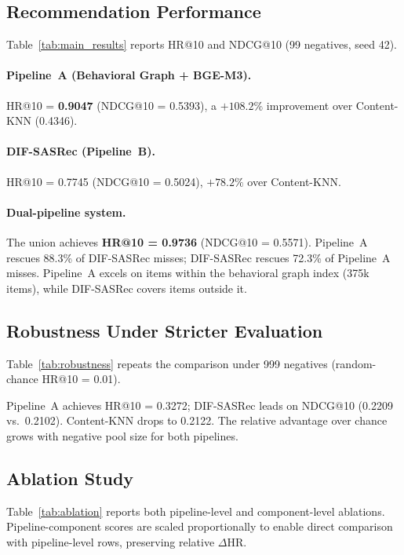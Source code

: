 \subsection{Recommendation Performance}
Table~\ref{tab:main_results} reports HR@10 and NDCG@10 (99 negatives, seed 42).

\paragraph{Pipeline~A (Behavioral Graph + BGE-M3).}
HR@10 = \textbf{0.9047} (NDCG@10 = 0.5393), a $+108.2\%$ improvement over
Content-KNN (0.4346).

\paragraph{DIF-SASRec (Pipeline~B).}
HR@10 = 0.7745 (NDCG@10 = 0.5024), $+78.2\%$ over Content-KNN.

\paragraph{Dual-pipeline system.}
The union achieves \textbf{HR@10 = 0.9736} (NDCG@10 = 0.5571).
Pipeline~A rescues 88.3\% of DIF-SASRec misses; DIF-SASRec rescues 72.3\%
of Pipeline~A misses. Pipeline~A excels on items within the behavioral
graph index (375k items), while DIF-SASRec covers items outside it.




\subsection{Robustness Under Stricter Evaluation}
\label{ssec:robustness}

Table~\ref{tab:robustness} repeats the comparison under 999 negatives
(random-chance HR@10 = 0.01).

Pipeline~A achieves HR@10 = 0.3272; DIF-SASRec leads on NDCG@10 (0.2209 vs.\
0.2102). Content-KNN drops to 0.2122. The relative advantage over
chance grows with negative pool size for both pipelines.



\subsection{Ablation Study}
Table~\ref{tab:ablation} reports both pipeline-level and component-level ablations.
Pipeline-component scores are scaled proportionally to enable direct comparison
with pipeline-level rows, preserving relative $\Delta$HR.

